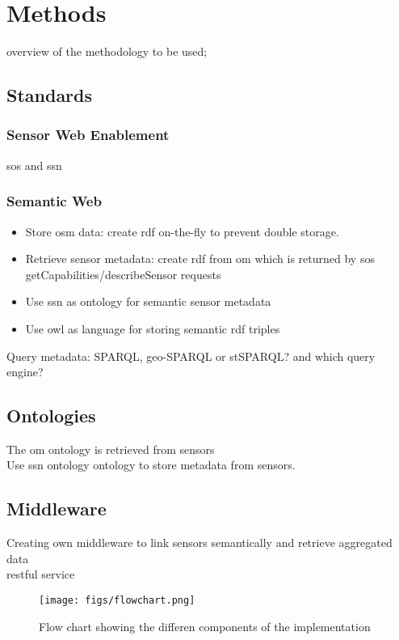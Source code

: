 \chapter{Methods}
\label{chap:methods}

overview of the methodology to be used;

\section{Standards}
\subsection{Sensor Web Enablement}
\ac{sos} and \ac{ssn}

\subsection{Semantic Web}

\begin{itemize}
	\item Store \ac{osm} data: create \ac{rdf} on-the-fly to prevent double storage. 
	\item Retrieve sensor metadata: create \ac{rdf} from \ac{om} which is returned by \ac{sos} getCapabilities/describeSensor requests
	\item Use \ac{ssn} as ontology for semantic sensor metadata 
	\item Use \ac{owl} as language for storing semantic \ac{rdf} triples
\end{itemize}


Query metadata: SPARQL, geo-SPARQL or stSPARQL? and which query engine?

\section{Ontologies}
The \ac{om} ontology is retrieved from sensors\\
Use \ac{ssn} ontology ontology to store metadata from sensors.  

\section{Middleware}
Creating own middleware to link sensors semantically and retrieve aggregated data\\

\ac{rest}ful service

\begin{figure}
	\centering
	\texttt{[image: figs/flowchart.png]}
	\caption{Flow chart showing the differen components of the implementation}
	\label{fig:Flowchart}
\end{figure}




